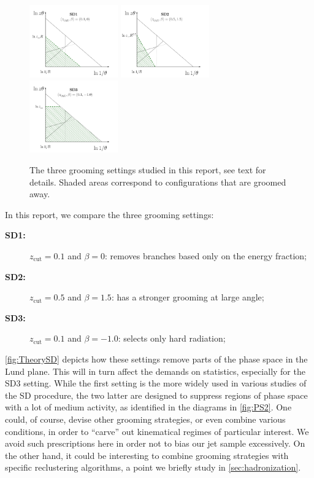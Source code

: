\begin{figure}[t!]
\centering
\includegraphics[width=0.34\textwidth]{figures/kinematics/plotVac_SD1_4}%
\includegraphics[width=0.34\textwidth]{figures/kinematics/plotVac_SD2_4}%
\includegraphics[width=0.34\textwidth]{figures/kinematics/plotVac_SD3_4}%
\caption{The three grooming settings studied in this report, see text for details. Shaded areas correspond to configurations that are groomed away.}
\label{fig:TheorySD}
\end{figure}
In this report, we compare the three grooming settings:
\begin{description}
\item[{\bf SD1:}] $z_{\text{cut}}=0.1$ and $\beta=0$: removes branches based only on the energy fraction;
\item[{\bf SD2:}]  $z_{\text{cut}}=0.5$ and $\beta=1.5$: has a stronger grooming at large angle;
\item[{\bf SD3:}]  $z_{\text{cut}}=0.1$ and $\beta=-1.0$: selects only hard radiation;
\end{description}
\autoref{fig:TheorySD} depicts how these settings remove parts of the phase space in the Lund plane. This will in turn affect the demands on statistics, especially for the SD3 setting. While the first setting is the more widely used in various studies of the SD procedure, the two latter are designed to suppress regions of phase space with a lot of medium activity, as identified in the diagrams in \autoref{fig:PS2}. One could, of course, devise other grooming strategies, or even combine various conditions, in order to ``carve'' out kinematical regimes of particular interest. We avoid such prescriptions here in order not to bias our jet sample excessively. On the other hand, it could be interesting to combine grooming strategies with specific reclustering algorithms, a point we briefly study in \autoref{sec:hadronization}.

